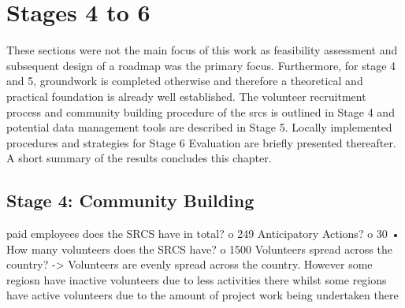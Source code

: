 \section{Stages 4 to 6}
These sections were not the main focus of this work as feasibility assessment and subsequent design of a roadmap was the primary focus. Furthermore, for stage 4 and 5, groundwork is completed otherwise and therefore a theoretical and practical foundation is already well established. The volunteer recruitment process and community building procedure of the \acrshort*{srcs} is outlined in Stage 4 and potential data management tools are described in Stage 5. Locally implemented procedures and strategies for Stage 6 Evaluation are briefly presented thereafter. A short summary of the results concludes this chapter.



\subsection{Stage 4: Community Building} %
paid employees does the SRCS have in total?
o	249
Anticipatory Actions?
o	30
•	How many volunteers does the SRCS have?
o	1500
Volunteers spread across the country? 
-> Volunteers are evenly spread across the country.
However some regiosn have inactive volunteers due to less activities there whilst some regions have active volunteers due to the amount of project work being undertaken there










